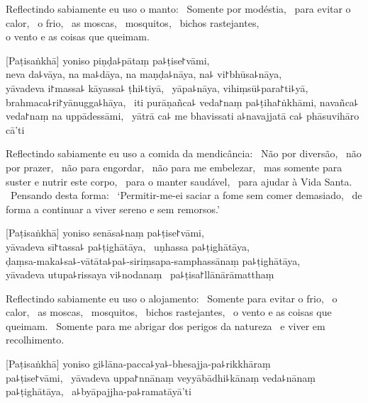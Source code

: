 \begin{english}
  Reflectindo sabiamente eu uso o manto: \pause\ Somente por modéstia, \pause\
  para evitar o calor, \pause\ o frio, \pause\ as moscas, \pause\ mosquitos,
  \pause\ bichos rastejantes, \pause\\ o vento e as coisas que queimam.
\end{english}

[Paṭisaṅkhā] yoniso piṇḍa꜕pātaṃ pa꜕ṭise꜓vāmi, \pause\\
neva da꜕vāya, na ma꜕dāya, na maṇḍa꜕nāya, na꜕ vi꜓bhūsa꜕nāya, \pause\\
yāvadeva i꜓massa꜕ kāyassa꜕ ṭhi꜕tiyā, \pause\ yāpa꜕nāya, vihiṃsū꜕para꜓ti꜕yā, \pause\\
brahmaca꜕ri꜓yānugga꜕hāya, \pause\ iti purāṇañca꜕ veda꜓naṃ pa꜕ṭiha꜓ṅkhāmi,
navañca꜕ veda꜓naṃ na uppādessāmi, \pause\ yātrā ca꜕ me bhavissati a꜕navajjatā
ca꜕ phāsuvihāro cā'ti

\begin{english}
  Reflectindo sabiamente eu uso a comida da mendicância: \pause\ Não por
  diversão, \pause\ não por prazer, \pause\ não para engordar, \pause\ não para
  me embelezar, \pause\ mas somente para suster e nutrir este corpo, \pause\
  para o manter saudável, \pause\ para ajudar à Vida Santa. \pause\ Pensando
  desta forma: \pause\ `Permitir-me-ei saciar a fome sem comer demasiado, \pause\ de
  forma a continuar a viver sereno e sem remorsos.'
\end{english}

\clearpage

[Paṭisaṅkhā] yoniso senāsa꜕naṃ pa꜕ṭise꜓vāmi, \pause\\
yāvadeva sī꜓tassa꜕ pa꜕ṭighātāya, \pause\ uṇhassa pa꜕ṭighātāya, \pause\\
ḍaṃsa-maka꜕sa꜕-vātāta꜕pa꜕-siriṃsapa-samphassānaṃ pa꜕ṭighātāya, \pause\\
yāvadeva utupa꜕rissaya vi꜕nodanaṃ \pause\ pa꜕ṭisa꜓llānārāmatthaṃ

\begin{english}
  Reflectindo sabiamente eu uso o alojamento: \pause\ Somente para evitar o
  frio, \pause\ o calor, \pause\ as moscas, \pause\ mosquitos, \pause\ bichos
  rastejantes, \pause\ o vento e as coisas que queimam. \pause\ Somente para me
  abrigar dos perigos da natureza \pause\ e viver em recolhimento.
\end{english}

[Paṭisaṅkhā] yoniso gi꜕lāna-pacca꜕ya꜕-bhesajja-pa꜕rikkhāraṃ\\
pa꜕ṭise꜓vāmi, \pause\ yāvadeva uppa꜓nnānaṃ veyyābādhi꜕kānaṃ veda꜕nānaṃ
pa꜕ṭighātāya, \pause\ a꜕byāpajjha-pa꜕ramatāyā'ti

